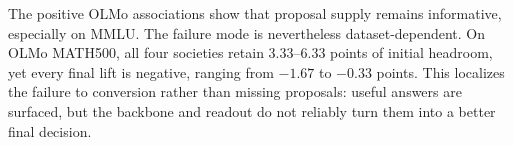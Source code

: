The positive OLMo associations show that proposal supply remains informative,
especially on MMLU. The failure mode is nevertheless dataset-dependent. On
OLMo MATH500, all four societies retain 3.33--6.33 points of initial headroom,
yet every final lift is negative, ranging from $-1.67$ to $-0.33$ points. This
localizes the failure to conversion rather than missing proposals: useful
answers are surfaced, but the backbone and readout do not reliably turn them
into a better final decision.
